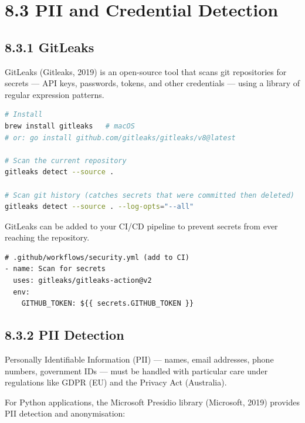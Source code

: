 \documentclass[11pt,a4paper]{book}
\begin{document}
\medskip

\section{8.3 PII and Credential Detection}

\subsection{8.3.1 GitLeaks}

GitLeaks (Gitleaks, 2019) is an open-source tool that scans git repositories for secrets --- API keys, passwords, tokens, and other credentials --- using a library of regular expression patterns.

\begin{lstlisting}[language=Bash]
# Install
brew install gitleaks   # macOS
# or: go install github.com/gitleaks/gitleaks/v8@latest

# Scan the current repository
gitleaks detect --source .

# Scan git history (catches secrets that were committed then deleted)
gitleaks detect --source . --log-opts="--all"
\end{lstlisting}

GitLeaks can be added to your CI/CD pipeline to prevent secrets from ever reaching the repository.

\begin{lstlisting}
# .github/workflows/security.yml (add to CI)
- name: Scan for secrets
  uses: gitleaks/gitleaks-action@v2
  env:
    GITHUB_TOKEN: ${{ secrets.GITHUB_TOKEN }}
\end{lstlisting}

\subsection{8.3.2 PII Detection}

Personally Identifiable Information (PII) --- names, email addresses, phone numbers, government IDs --- must be handled with particular care under regulations like GDPR (EU) and the Privacy Act (Australia).

For Python applications, the Microsoft Presidio library (Microsoft, 2019) provides PII detection and anonymisation:
\end{document}
